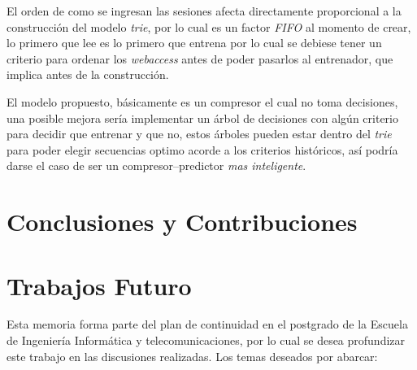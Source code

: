



 


 


 

El orden de como se ingresan las sesiones afecta directamente proporcional a la construcción del modelo \emph{trie},  por lo cual es un factor  \emph{FIFO} al momento de crear, lo primero que lee es lo primero que entrena por lo cual se debiese tener un criterio para ordenar los \emph{webaccess} antes de poder pasarlos al entrenador, que implica antes de la construcción.

El modelo propuesto, básicamente es un compresor el cual no toma decisiones, una posible mejora sería implementar un árbol de decisiones con algún criterio para decidir que entrenar y que no, estos árboles pueden estar dentro del \emph{trie} para
poder elegir secuencias optimo acorde a los criterios históricos, así podría darse el caso de ser un compresor--predictor  \emph{mas inteligente}.



















\vspace{2cm}
\section{Conclusiones y Contribuciones}\label{ch:conlusion-contrib-all}
	






\newpage
\section{Trabajos Futuro}

Esta memoria forma parte del plan de continuidad en el postgrado de la Escuela de Ingeniería Informática y telecomunicaciones, por lo cual se desea profundizar este trabajo en las discusiones realizadas. Los temas deseados por abarcar:

